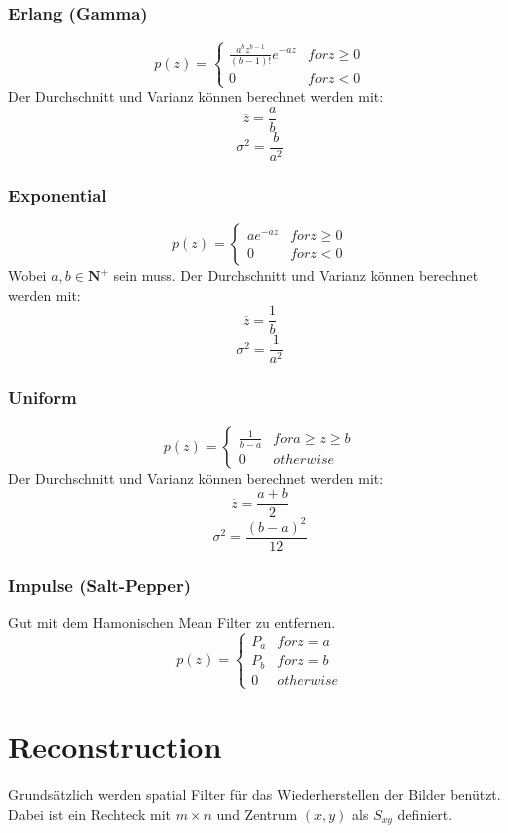 \subsubsection{Erlang (Gamma)}
\[
p(z) = \begin{cases}
	\frac{a^bz^{b-1}}{(b-1)!}e^{-az} & for z \ge 0 \\
	0 & for z \lt 0
\end{cases}
\]
Der Durchschnitt und Varianz können berechnet werden mit: 
\[
\overline{z} = \frac{a}{b}
\]
\[
\sigma^2 = \frac{b}{a^2}
\]

\subsubsection{Exponential}
\[
p(z) = \begin{cases}
	ae^{-az} & for z \ge 0 \\
	0 & for z \lt 0
\end{cases}
\]
Wobei $a,b \in \mathbf{N}^+$ sein muss. Der Durchschnitt und Varianz können berechnet werden mit: 
\[
\overline{z} = \frac{1}{b}
\]
\[
\sigma^2 = \frac{1}{a^2}
\]

\subsubsection{Uniform}
\[
p(z) = \begin{cases}
	\frac{1}{b-a} & for a \ge z \ge b \\
	0 & otherwise
\end{cases}
\]
Der Durchschnitt und Varianz können berechnet werden mit: 
\[
\overline{z} = \frac{a+b}{2}
\]
\[
\sigma^2 = \frac{(b-a)^2}{12}
\]

\subsubsection{Impulse (Salt-Pepper)}
Gut mit dem Hamonischen Mean Filter zu entfernen.
\[
p(z) = \begin{cases}
	P_a & for z = a \\
	P_b & for z = b \\
	0 & otherwise
\end{cases}
\]


\section{Reconstruction}
Grundsätzlich werden spatial Filter für das Wiederherstellen der Bilder benützt. Dabei ist ein Rechteck mit $m\times n$ und Zentrum $(x,y)$ als $S_{xy}$ definiert.


